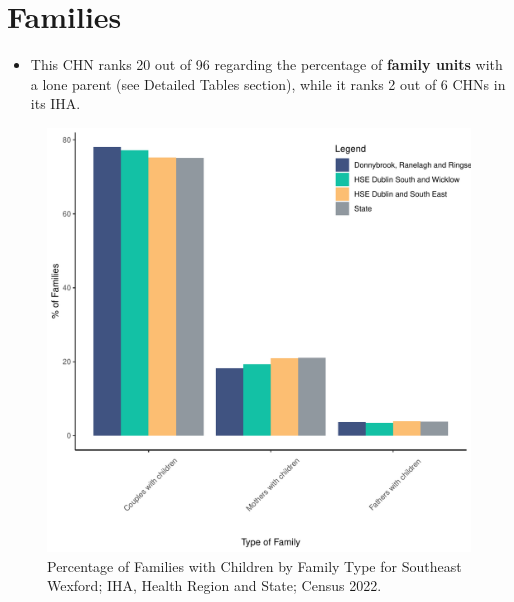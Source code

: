 \documentclass{article}
\begin{document}
\section{Families}\label{sect:Fam}
\begin{itemize}
\item This CHN ranks  20 out of 96 regarding the percentage of \textbf{family units} with a lone parent (see Detailed Tables section), while it ranks   2 out of 6 CHNs in its IHA.
\end{itemize}
\begin{figure}[H]
	\centering
	\includegraphics[width = 150mm]{../figures/FamED.pdf}
	\caption{Percentage of Families with Children by Family Type for Southeast Wexford; IHA, Health Region and State; Census 2022.}
	\label{fig:vbnv}
	\end{figure}
	
\end{document}
